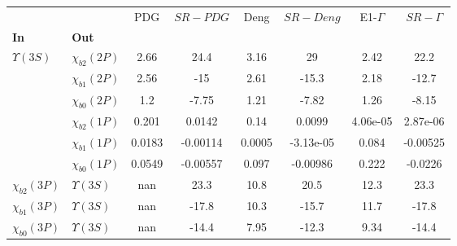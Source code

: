 \begin{tabular}{l|l|c|c|c|c|c|c}
\toprule
                &                &    PDG & $SR-PDG$ &   Deng & $SR-Deng$ &  E1-$\Gamma$ & $SR-\Gamma$ \\
\textbf{In} & \textbf{Out} &        &          &        &           &              &             \\
\midrule
\textbf{$\Upsilon(3S)$} & \textbf{$\chi_{b2}(2P)$} &   2.66 &     24.4 &   3.16 &        29 &         2.42 &        22.2 \\
                & \textbf{$\chi_{b1}(2P)$} &   2.56 &      -15 &   2.61 &     -15.3 &         2.18 &       -12.7 \\
                & \textbf{$\chi_{b0}(2P)$} &    1.2 &    -7.75 &   1.21 &     -7.82 &         1.26 &       -8.15 \\
                & \textbf{$\chi_{b2}(1P)$} &  0.201 &   0.0142 &   0.14 &    0.0099 &     4.06e-05 &    2.87e-06 \\
                & \textbf{$\chi_{b1}(1P)$} & 0.0183 & -0.00114 & 0.0005 & -3.13e-05 &        0.084 &    -0.00525 \\
                & \textbf{$\chi_{b0}(1P)$} & 0.0549 & -0.00557 &  0.097 &  -0.00986 &        0.222 &     -0.0226 \\
\textbf{$\chi_{b2}(3P)$} & \textbf{$\Upsilon(3S)$} &    nan &     23.3 &   10.8 &      20.5 &         12.3 &        23.3 \\
\textbf{$\chi_{b1}(3P)$} & \textbf{$\Upsilon(3S)$} &    nan &    -17.8 &   10.3 &     -15.7 &         11.7 &       -17.8 \\
\textbf{$\chi_{b0}(3P)$} & \textbf{$\Upsilon(3S)$} &    nan &    -14.4 &   7.95 &     -12.3 &         9.34 &       -14.4 \\
\bottomrule
\end{tabular}
